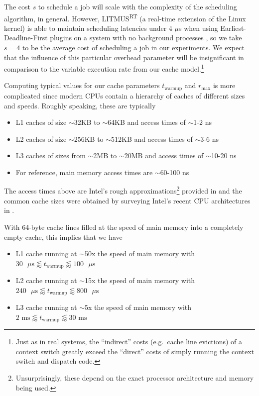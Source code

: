 \documentclass[11pt]{article}
\begin{document}
The cost $s$ to schedule a job will scale with the complexity of the scheduling algorithm, in general. However, LITMUS\textsuperscript{RT} (a real-time extension of the Linux kernel) is able to maintain scheduling latencies under 4 $\mu$s when using Earliest-Deadline-First plugins on a system with no background processes \cite{Cerqueira}, so we take $s=4$ to be the average cost of scheduling a job in our experiments. We expect that the influence of this particular overhead parameter will be insignificant in comparison to the variable execution rate from our cache model.\footnote{Just as in real systems, the ``indirect'' costs (e.g.\ cache line evictions) of a context switch greatly exceed the ``direct'' costs of simply running the context switch and dispatch code.}

Computing typical values for our cache parameters $t_\text{warmup}$ and $r_\text{max}$ is more complicated since modern CPUs contain a hierarchy of caches of different sizes and speeds. Roughly speaking, these are typically

\begin{itemize}\itemsep0em
	\item L1 caches of size ${\sim}$32KB to ${\sim}$64KB and access times of ${\sim}$1-2 ns
	\item L2 caches of size ${\sim}$256KB to ${\sim}$512KB and access times of ${\sim}$3-6 ns
	\item L3 caches of sizes from ${\sim}$2MB to ${\sim}$20MB and access times of ${\sim}$10-20 ns
	\item For reference, main memory access times are ${\sim}$60-100 ns
\end{itemize}

The access times above are Intel's rough approximations\footnote{Unsurprisingly, these depend on the exact processor architecture and memory being used.} provided in \cite{Levinthal} and the common cache sizes were obtained by surveying Intel's recent CPU architectures in \cite{Intel}.

With 64-byte cache lines filled at the speed of main memory into a completely empty cache, this implies that we have

\begin{itemize}\itemsep0em
	\item L1 cache running at ${\sim}$50x the speed of main memory with $30 \text{ $\mu$s} \lessapprox t_\text{warmup} \lessapprox 100 \text{ $\mu$s}$
	\item L2 cache running at ${\sim}$15x the speed of main memory with $240 \text{ $\mu$s} \lessapprox t_\text{warmup} \lessapprox 800 \text{ $\mu$s}$
	\item L3 cache running at ${\sim}$5x the speed of main memory with $2 \text{ ms} \lessapprox t_\text{warmup} \lessapprox 30 \text{ ms}$
\end{itemize}
\end{document}
